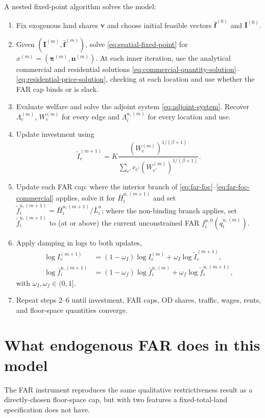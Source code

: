 \documentclass[12pt,a4paper]{article}
\newcommand{\1}{\mathbb 1}
\begin{document}
A nested fixed-point algorithm solves the model:
\begin{enumerate}
\item Fix exogenous land shares $\mathbf v$ and choose initial feasible vectors $\bar{\mathbf f}^{(0)}$ and $\mathbf I^{(0)}$.
\item Given $(\mathbf I^{(m)},\bar{\mathbf f}^{(m)})$, solve \eqref{eq:spatial-fixed-point} for $x^{(m)}=(\boldsymbol\pi^{(m)},\mathbf n^{(m)})$. At each inner iteration, use the analytical commercial and residential solutions \eqref{eq:commercial-quantity-solution}--\eqref{eq:residential-price-solution}, checking at each location and use whether the FAR cap binds or is slack.
\item Evaluate welfare and solve the adjoint system \eqref{eq:adjoint-system}. Recover $\Lambda_e^{(m)}$, $W_e^{(m)}$ for every edge and $\Lambda_i^{u,(m)}$ for every location and use.
\item Update investment using
\[
\widetilde I_e^{(m+1)}
=
K
\frac{(W_e^{(m)})^{1/(\beta+1)}}
{\sum_{e'}c_{e'}(W_{e'}^{(m)})^{1/(\beta+1)}}.
\]
\item Update each FAR cap: where the interior branch of \eqref{eq:far-foc}--\eqref{eq:far-foc-commercial} applies, solve it for $\bar H_i^{u,(m+1)}$ and set $\widetilde f_i^{u,(m+1)}=\bar H_i^{u,(m+1)}/\bar L_i^u$; where the non-binding branch applies, set $\widetilde f_i^{u,(m+1)}$ to (at or above) the current unconstrained FAR $f_i^{u,0}(q_i^{u,(m)})$.
\item Apply damping in logs to both updates,
\begin{align*}
\log I_e^{(m+1)}
&=
(1-\omega_I)\log I_e^{(m)}+\omega_I\log\widetilde I_e^{(m+1)},\\
\log \bar f_i^{u,(m+1)}
&=
(1-\omega_f)\log \bar f_i^{u,(m)}+\omega_f\log\widetilde f_i^{u,(m+1)},
\end{align*}
with $\omega_I,\omega_f\in(0,1]$.
\item Repeat steps 2--6 until investment, FAR caps, OD shares, traffic, wages, rents, and floor-space quantities converge.
\end{enumerate}

\section{What endogenous FAR does in this model}

The FAR instrument reproduces the same qualitative restrictiveness result as a directly-chosen floor-space cap, but with two features a fixed-total-land specification does not have.
\end{document}
